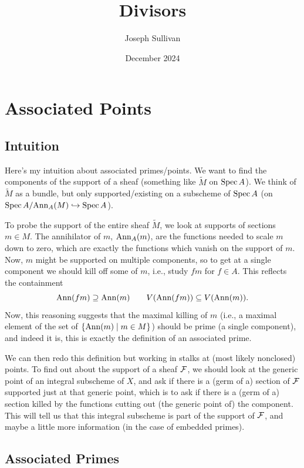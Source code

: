 \documentclass[12pt]{article}
\title{Divisors}
\author{Joseph Sullivan}
\date{December 2024}
\begin{document}
\maketitle

\tableofcontents

\section{Associated Points}

\subsection{Intuition}

Here's my intuition about associated primes/points. We want to find the components of the support of a sheaf (something like $\tilde{M}$ on $\operatorname{Spec} A$). We think of $\tilde{M}$ as a bundle, but only supported/existing on a subscheme of $\operatorname{Spec} A$ (on $\operatorname{Spec} A/\mathrm{Ann}_A(M) \hookrightarrow \operatorname{Spec} A$).

To probe the support of the entire sheaf $\tilde{M}$, we look at supports of sections $m\in M$. The annihilator of $m$, $\mathrm{Ann}_A(m)$, are the functions needed to scale $m$ down to zero, which are exactly the functions which vanish on the support of $m$. Now, $m$ might be supported on multiple components, so to get at a single component we should kill off some of $m$, i.e., study $fm$ for $f\in A$. This reflects the containment
\[\mathrm{Ann}(fm) \supseteq \mathrm{Ann}(m) \qquad V(\mathrm{Ann}(fm)) \subseteq V(\mathrm{Ann}(m)).\]
Now, this reasoning suggests that the maximal killing of $m$ (i.e., a maximal element of the set of $\{\mathrm{Ann}(m) \mid m\in M\}$) should be prime (a single component), and indeed it is, this is exactly the definition of an associated prime.

We can then redo this definition but working in stalks at (most likely nonclosed) points. To find out about the support of a sheaf $\mathcal{F}$, we should look at the generic point of an integral subscheme of $X$, and ask if there is a (germ of a) section of $\mathcal{F}$ supported just at that generic point, which is to ask if there is a (germ of a) section killed by the functions cutting out (the generic point of) the component. This will tell us that this integral subscheme is part of the support of $\mathcal{F}$, and maybe a little more information (in the case of embedded primes).

\subsection{Associated Primes}
\end{document}

